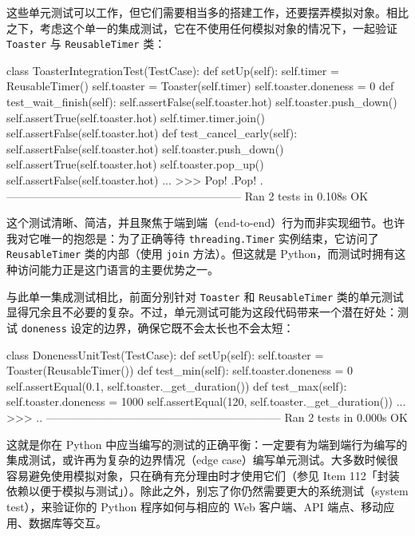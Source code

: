 这些单元测试可以工作，但它们需要相当多的搭建工作，还要摆弄模拟对象。相比之下，考虑这个单一的集成测试，它在不使用任何模拟对象的情况下，一起验证 \texttt{Toaster} 与 \texttt{ReusableTimer} 类：

\begin{codebox}[python]
class ToasterIntegrationTest(TestCase):
    def setUp(self):
        self.timer = ReusableTimer()
        self.toaster = Toaster(self.timer)
        self.toaster.doneness = 0
    def test_wait_finish(self):
        self.assertFalse(self.toaster.hot)
        self.toaster.push_down()
        self.assertTrue(self.toaster.hot)
        self.timer.timer.join()
        self.assertFalse(self.toaster.hot)
    def test_cancel_early(self):
        self.assertFalse(self.toaster.hot)
        self.toaster.push_down()
        self.assertTrue(self.toaster.hot)
        self.toaster.pop_up()
        self.assertFalse(self.toaster.hot)
...
>>>
Pop!
.Pop!
.
---------------------------------------------------------------
Ran 2 tests in 0.108s
OK
\end{codebox}

这个测试清晰、简洁，并且聚焦于端到端（end-to-end）行为而非实现细节。也许我对它唯一的抱怨是：为了正确等待 \texttt{threading.Timer} 实例结束，它访问了 \texttt{ReusableTimer} 类的内部（使用 \texttt{join} 方法）。但这就是 Python，而测试时拥有这种访问能力正是这门语言的主要优势之一。

与此单一集成测试相比，前面分别针对 \texttt{Toaster} 和 \texttt{ReusableTimer} 类的单元测试显得冗余且不必要的复杂。不过，单元测试可能为这段代码带来一个潜在好处：测试 \texttt{doneness} 设定的边界，确保它既不会太长也不会太短：

\begin{codebox}[python]
class DonenessUnitTest(TestCase):
    def setUp(self):
        self.toaster = Toaster(ReusableTimer())
    def test_min(self):
        self.toaster.doneness = 0
        self.assertEqual(0.1, self.toaster._get_duration())
    def test_max(self):
        self.toaster.doneness = 1000
        self.assertEqual(120, self.toaster._get_duration())
...
>>>
..
---------------------------------------------------------------
Ran 2 tests in 0.000s
OK
\end{codebox}

这就是你在 Python 中应当编写的测试的正确平衡：一定要有为端到端行为编写的集成测试，或许再为复杂的边界情况（edge case）编写单元测试。大多数时候很容易避免使用模拟对象，只在确有充分理由时才使用它们（参见 Item 112「封装依赖以便于模拟与测试」）。除此之外，别忘了你仍然需要更大的系统测试（system test），来验证你的 Python 程序如何与相应的 Web 客户端、API 端点、移动应用、数据库等交互。

